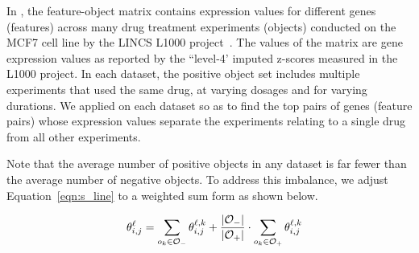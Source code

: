 In \lincs, the feature-object matrix
contains expression values for different genes
(features) across many drug treatment experiments
(objects) conducted on the MCF7 cell line by the LINCS L1000 project~\cite{subramanian2017next}.
The values of the matrix are gene expression values as reported by the ``level-4' imputed z-scores measured in the L1000 project.
In each dataset, the positive object set includes
multiple experiments that used the same drug, at varying dosages and for varying durations. We applied \genviz on each dataset
so as to find the top pairs of genes (feature pairs)
whose expression values separate the \lincs experiments
relating to a single drug from all other \lincs experiments.


Note that the average number of positive objects
in any dataset is far fewer than the average number
of negative objects. To address this imbalance,
we adjust Equation~\ref{eqn:s_line}
to a weighted sum form as shown below.


\begin{equation}\label{eqn:s_line_weighted}
\hspace{3mm} \theta_{i,j}^{\ell}= \sum_{o_k\in{\oo_-}}{\theta_{i,j}^{\ell,k}}+\frac{|\oo_-|}{|\oo_+|}\cdot\sum_{o_k\in{\oo_+}}{\theta_{i,j}^{\ell,k}} %
\end{equation}



